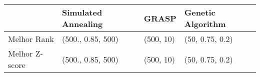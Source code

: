 \begin{table}
\centering
\label{tab:train_best_ones}
\begin{tabular}{llll}
\toprule
{} & Simulated Annealing &      GRASP & Genetic Algorithm \\
\midrule
Melhor Rank    &   (500., 0.85, 500) &  (500, 10) &   (50, 0.75, 0.2) \\
Melhor Z-score &   (500., 0.85, 500) &  (500, 10) &   (50, 0.75, 0.2) \\
\bottomrule
\end{tabular}
\end{table}
